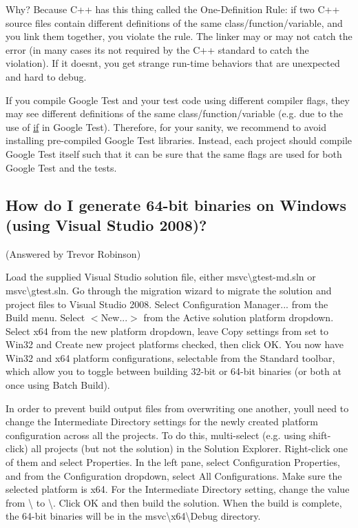 Why? Because C++ has this thing called the One-\/\+Definition Rule\+: if two C++ source files contain different definitions of the same class/function/variable, and you link them together, you violate the rule. The linker may or may not catch the error (in many cases it\textquotesingle{}s not required by the C++ standard to catch the violation). If it doesn\textquotesingle{}t, you get strange run-\/time behaviors that are unexpected and hard to debug.

If you compile Google Test and your test code using different compiler flags, they may see different definitions of the same class/function/variable (e.\+g. due to the use of {\ttfamily \hyperlink{jquery_8js_a42cbfadee2b4749e8f699ea8d745a0e4}{if}} in Google Test). Therefore, for your sanity, we recommend to avoid installing pre-\/compiled Google Test libraries. Instead, each project should compile Google Test itself such that it can be sure that the same flags are used for both Google Test and the tests.

\subsection*{How do I generate 64-\/bit binaries on Windows (using Visual Studio 2008)?}

(Answered by Trevor Robinson)

Load the supplied Visual Studio solution file, either {\ttfamily msvc\textbackslash{}gtest-\/md.\+sln} or {\ttfamily msvc\textbackslash{}gtest.\+sln}. Go through the migration wizard to migrate the solution and project files to Visual Studio 2008. Select {\ttfamily Configuration Manager...} from the {\ttfamily Build} menu. Select {\ttfamily $<$New...$>$} from the {\ttfamily Active solution platform} dropdown. Select {\ttfamily x64} from the new platform dropdown, leave {\ttfamily Copy settings from} set to {\ttfamily Win32} and {\ttfamily Create new project platforms} checked, then click {\ttfamily OK}. You now have {\ttfamily Win32} and {\ttfamily x64} platform configurations, selectable from the {\ttfamily Standard} toolbar, which allow you to toggle between building 32-\/bit or 64-\/bit binaries (or both at once using Batch Build).

In order to prevent build output files from overwriting one another, you\textquotesingle{}ll need to change the {\ttfamily Intermediate Directory} settings for the newly created platform configuration across all the projects. To do this, multi-\/select (e.\+g. using shift-\/click) all projects (but not the solution) in the {\ttfamily Solution Explorer}. Right-\/click one of them and select {\ttfamily Properties}. In the left pane, select {\ttfamily Configuration Properties}, and from the {\ttfamily Configuration} dropdown, select {\ttfamily All Configurations}. Make sure the selected platform is {\ttfamily x64}. For the {\ttfamily Intermediate Directory} setting, change the value from {\ttfamily \textbackslash{}} to {\ttfamily \textbackslash{}}. Click {\ttfamily OK} and then build the solution. When the build is complete, the 64-\/bit binaries will be in the {\ttfamily msvc\textbackslash{}x64\textbackslash{}Debug} directory.

